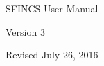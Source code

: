\begin{center}

\vspace*{2in}

{\Huge SFINCS User Manual}

\vspace{4in}

{\Large Version 3}

\vspace{0.5in}


Revised July 26, 2016

\end{center}

